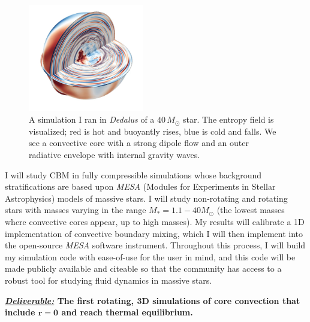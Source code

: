 \documentclass[12pt]{article}
\begin{document}
\begin{figure}
  \begin{center}
      \vspace{-1.6cm}
    \includegraphics[width=0.45\textwidth]{dedalus_massive_star.png}
      \vspace{-1.3cm}
  \end{center}
    \caption{A simulation I ran in \emph{Dedalus} of a {$40 \,M_{\odot}$} star. 
    The entropy field is visualized; red is hot and buoyantly rises, blue is cold and falls. 
    We see a convective core with a strong dipole flow and an outer radiative envelope with internal gravity waves. \label{fig:star}}
    \vspace{-0.5cm}
\end{figure}
I will study CBM in fully compressible simulations whose background stratifications are based upon \emph{MESA} (Modules for Experiments in Stellar Astrophysics) models of massive stars.
I will study non-rotating and rotating stars with masses varying in the range $M_* = 1.1-40 M_{\odot}$ (the lowest masses where convective cores appear, up to high masses).
My results will calibrate a 1D implementation of convective boundary mixing, which I will then implement into the open-source \emph{MESA} software instrument.
Throughout this process, I will build my simulation code with ease-of-use for the user in mind, and this code will be made publicly available and citeable so that the community has access to a robust tool for studying fluid dynamics in massive stars.

\textbf{\underline{\emph{Deliverable:}} The first rotating, 3D simulations of core convection that include $\boldsymbol{r = 0}$ and reach thermal equilibrium.}
\end{document}
